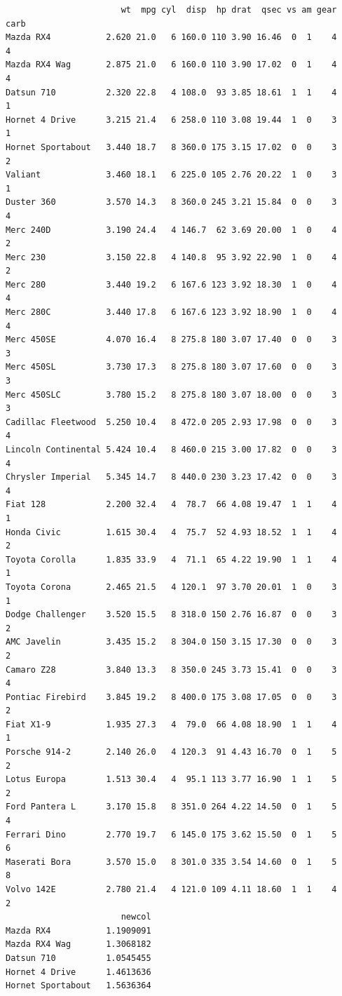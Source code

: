 \documentclass[
]{article}
\begin{document}
\begin{verbatim}
                       wt  mpg cyl  disp  hp drat  qsec vs am gear carb
Mazda RX4           2.620 21.0   6 160.0 110 3.90 16.46  0  1    4    4
Mazda RX4 Wag       2.875 21.0   6 160.0 110 3.90 17.02  0  1    4    4
Datsun 710          2.320 22.8   4 108.0  93 3.85 18.61  1  1    4    1
Hornet 4 Drive      3.215 21.4   6 258.0 110 3.08 19.44  1  0    3    1
Hornet Sportabout   3.440 18.7   8 360.0 175 3.15 17.02  0  0    3    2
Valiant             3.460 18.1   6 225.0 105 2.76 20.22  1  0    3    1
Duster 360          3.570 14.3   8 360.0 245 3.21 15.84  0  0    3    4
Merc 240D           3.190 24.4   4 146.7  62 3.69 20.00  1  0    4    2
Merc 230            3.150 22.8   4 140.8  95 3.92 22.90  1  0    4    2
Merc 280            3.440 19.2   6 167.6 123 3.92 18.30  1  0    4    4
Merc 280C           3.440 17.8   6 167.6 123 3.92 18.90  1  0    4    4
Merc 450SE          4.070 16.4   8 275.8 180 3.07 17.40  0  0    3    3
Merc 450SL          3.730 17.3   8 275.8 180 3.07 17.60  0  0    3    3
Merc 450SLC         3.780 15.2   8 275.8 180 3.07 18.00  0  0    3    3
Cadillac Fleetwood  5.250 10.4   8 472.0 205 2.93 17.98  0  0    3    4
Lincoln Continental 5.424 10.4   8 460.0 215 3.00 17.82  0  0    3    4
Chrysler Imperial   5.345 14.7   8 440.0 230 3.23 17.42  0  0    3    4
Fiat 128            2.200 32.4   4  78.7  66 4.08 19.47  1  1    4    1
Honda Civic         1.615 30.4   4  75.7  52 4.93 18.52  1  1    4    2
Toyota Corolla      1.835 33.9   4  71.1  65 4.22 19.90  1  1    4    1
Toyota Corona       2.465 21.5   4 120.1  97 3.70 20.01  1  0    3    1
Dodge Challenger    3.520 15.5   8 318.0 150 2.76 16.87  0  0    3    2
AMC Javelin         3.435 15.2   8 304.0 150 3.15 17.30  0  0    3    2
Camaro Z28          3.840 13.3   8 350.0 245 3.73 15.41  0  0    3    4
Pontiac Firebird    3.845 19.2   8 400.0 175 3.08 17.05  0  0    3    2
Fiat X1-9           1.935 27.3   4  79.0  66 4.08 18.90  1  1    4    1
Porsche 914-2       2.140 26.0   4 120.3  91 4.43 16.70  0  1    5    2
Lotus Europa        1.513 30.4   4  95.1 113 3.77 16.90  1  1    5    2
Ford Pantera L      3.170 15.8   8 351.0 264 4.22 14.50  0  1    5    4
Ferrari Dino        2.770 19.7   6 145.0 175 3.62 15.50  0  1    5    6
Maserati Bora       3.570 15.0   8 301.0 335 3.54 14.60  0  1    5    8
Volvo 142E          2.780 21.4   4 121.0 109 4.11 18.60  1  1    4    2
                       newcol
Mazda RX4           1.1909091
Mazda RX4 Wag       1.3068182
Datsun 710          1.0545455
Hornet 4 Drive      1.4613636
Hornet Sportabout   1.5636364

\end{verbatim}
\end{document}
